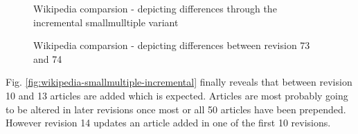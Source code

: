 \begin{figure}[tb]
\caption{\label{fig:wikipedia-incremental} Wikipedia comparsion - depicting differences through the incremental smallmulltiple variant}
\end{figure}

\begin{figure}[tb]
\caption{\label{fig:wikipedia-rev7374} Wikipedia comparsion - depicting differences between revision 73 and 74}
\end{figure}

Fig. \ref{fig:wikipedia-smallmultiple-incremental} finally reveals that between revision 10 and 13 articles are added which is expected. Articles are most probably going to be altered in later revisions once most or all 50 articles have been pre\-pen\-ded. However revision 14 updates an article added in one of the first 10 revisions.

